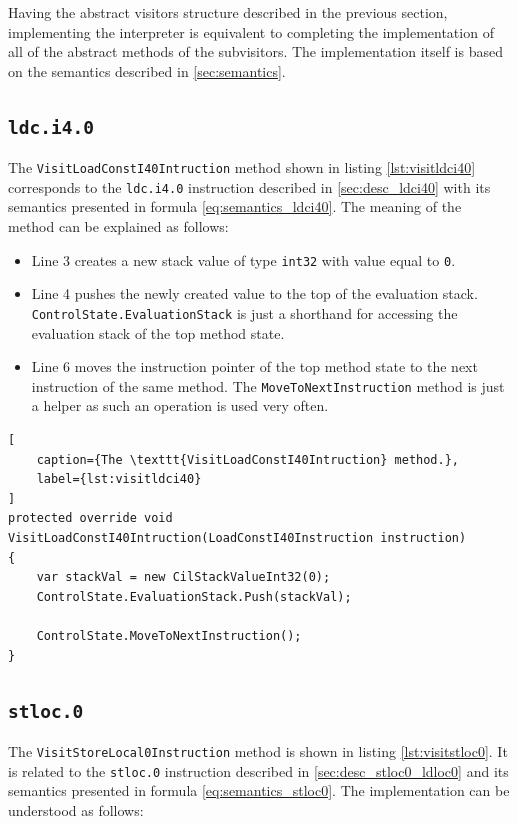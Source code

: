 \documentclass[declaration,shortabstract,english,mgr]{iithesis}
\begin{document}
Having the abstract visitors structure described in the previous section, implementing the interpreter is equivalent to completing the implementation of all of the abstract methods of the subvisitors. The implementation itself is based on the semantics described in \ref{sec:semantics}.

\subsection{\texttt{ldc.i4.0}}

The \texttt{VisitLoadConstI40Intruction} method shown in listing \ref{lst:visitldci40} corresponds to the \texttt{ldc.i4.0} instruction described in \ref{sec:desc_ldci40} with its semantics presented in formula \ref{eq:semantics_ldci40}. The meaning of the method can be explained as follows:
\begin{itemize}
	\item{Line 3 creates a new stack value of type \texttt{int32} with value equal to \texttt{0}.}
	\item{Line 4 pushes the newly created value to the top of the evaluation stack. \texttt{ControlState.EvaluationStack} is just a shorthand for accessing the evaluation stack of the top method state.}
	\item{Line 6 moves the instruction pointer of the top method state to the next instruction of the same method. The \texttt{MoveToNextInstruction} method is just a helper as such an operation is used very often.}
\end{itemize}

\begin{lstlisting}[
	caption={The \texttt{VisitLoadConstI40Intruction} method.},
	label={lst:visitldci40}
]
protected override void VisitLoadConstI40Intruction(LoadConstI40Instruction instruction)
{
	var stackVal = new CilStackValueInt32(0);
	ControlState.EvaluationStack.Push(stackVal);

	ControlState.MoveToNextInstruction();
}
\end{lstlisting}

\subsection{\texttt{stloc.0}}

The \texttt{VisitStoreLocal0Instruction} method is shown in listing \ref{lst:visitstloc0}. It is related to the \texttt{stloc.0} instruction described in \ref{sec:desc_stloc0_ldloc0} and its semantics presented in formula \ref{eq:semantics_stloc0}. The implementation can be understood as follows:
\end{document}
